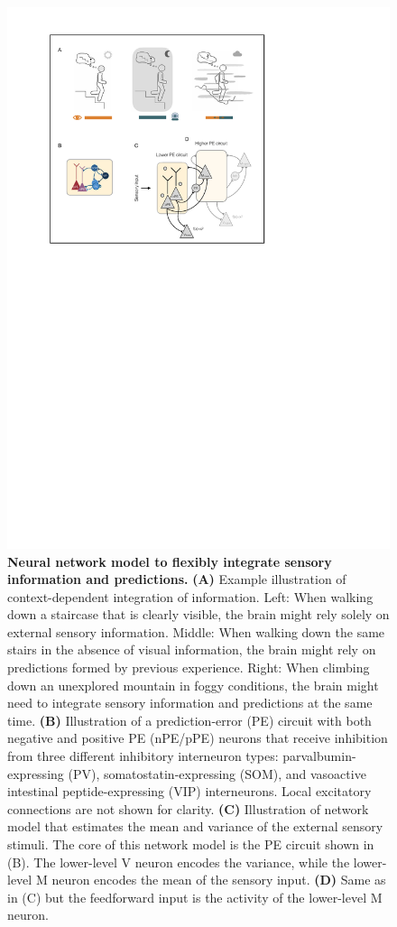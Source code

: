 \documentclass[10pt,a4paper,draft]{article}
\begin{document}
%
\begin{figure}[t!]
	\centering
    \includegraphics{../results/figures/final/Fig_1}
\caption{\footnotesize{\bf Neural network model to flexibly integrate sensory information and predictions.\newline} 
{\bf (A)} Example illustration of context-dependent integration of information. Left: When walking down a staircase that is clearly visible, the brain might rely solely on external sensory information. Middle: When walking down the same stairs in the absence of visual information, the brain might rely on predictions formed by previous experience. Right: When climbing down an unexplored mountain in foggy conditions, the brain might need to integrate sensory information and predictions at the same time.
{\bf (B)} Illustration of a prediction-error (PE) circuit with both negative and positive PE (nPE/pPE) neurons that receive inhibition from three different inhibitory interneuron types: parvalbumin-expressing (PV), somatostatin-expressing (SOM), and vasoactive intestinal peptide-expressing (VIP) interneurons. Local excitatory connections are not shown for clarity.
{\bf (C)} Illustration of network model that estimates the mean and variance of the external sensory stimuli. The core of this network model is the PE circuit shown in (B). The lower-level V neuron encodes the variance, while the lower-level M neuron encodes the mean of the sensory input.
{\bf (D)} Same as in (C) but the feedforward input is the activity of the lower-level M neuron.
}
\label{fig:Fig_1}
\end{figure}
%
\end{document}
